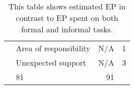\begin{table}[h]
\begin{tabular}{llrr}
        &Area of responsibility                                        & N/A          & 1            \\
        &Unexpected support                                            & N/A          & 3            \\
        \tblgrpsep
        \midrule
        \multicolumn{2}{l}{Total}                                                         & 81           & 91           \\
    \end{tabular}
    \caption{This table shows estimated EP in contrast to EP spent on both formal and informal tasks.}\label{tab:sprint1tasktable}
\end{table}
